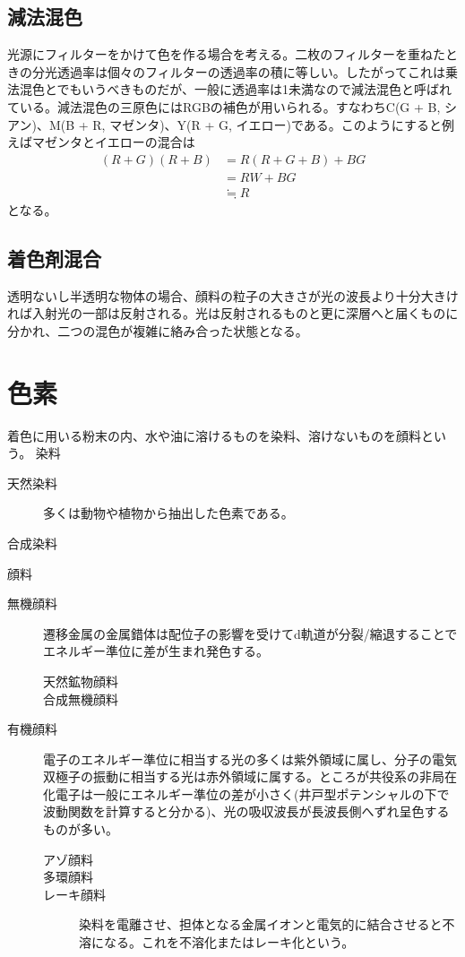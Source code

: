 \documentclass{jsarticle}
\begin{document}
		\subsection{減法混色}
			光源にフィルターをかけて色を作る場合を考える。二枚のフィルターを重ねたときの分光透過率は個々のフィルターの透過率の積に等しい。したがってこれは乗法混色とでもいうべきものだが、一般に透過率は1未満なので減法混色と呼ばれている。減法混色の三原色にはRGBの補色が用いられる。すなわちC(G + B, シアン)、M(B + R, マゼンタ)、Y(R + G, イエロー)である。このようにすると例えばマゼンタとイエローの混合は
			\begin{align*}
				(R + G)(R + B) &= R(R + G + B) + BG\\
				&= RW + BG \\
				&\fallingdotseq R
			\end{align*}
			となる。
		\subsection{着色剤混合}
			透明ないし半透明な物体の場合、顔料の粒子の大きさが光の波長より十分大きければ入射光の一部は反射される。光は反射されるものと更に深層へと届くものに分かれ、二つの混色が複雑に絡み合った状態となる。

	\section{色素}
		着色に用いる粉末の内、水や油に溶けるものを染料、溶けないものを顔料という。
		染料
		\begin{description}
			\item[天然染料] 多くは動物や植物から抽出した色素である。
			\item[合成染料]
		\end{description}
		顔料
		\begin{description}
			\item[無機顔料] 遷移金属の金属錯体は配位子の影響を受けてd軌道が分裂/縮退することでエネルギー準位に差が生まれ発色する。
				\begin{description}
					\item[天然鉱物顔料] 
					\item[合成無機顔料] 
				\end{description}
			\item[有機顔料] 電子のエネルギー準位に相当する光の多くは紫外領域に属し、分子の電気双極子の振動に相当する光は赤外領域に属する。ところが共役系の非局在化電子は一般にエネルギー準位の差が小さく(井戸型ポテンシャルの下で波動関数を計算すると分かる)、光の吸収波長が長波長側へずれ呈色するものが多い。
				\begin{description}
					\item[アゾ顔料] 
					\item[多環顔料] 
					\item[レーキ顔料] 染料を電離させ、担体となる金属イオンと電気的に結合させると不溶になる。これを不溶化またはレーキ化という。
				\end{description}
		\end{description}
\end{document}
